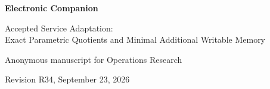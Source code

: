 \documentclass[11pt,letterpaper]{article}
\theoremstyle{definition}\newtheorem{assumption}[theorem]{Assumption}
\begin{document}
\begin{center}{\Large\bfseries Electronic Companion}\par\medskip
{\large Accepted Service Adaptation:\\ Exact Parametric Quotients and Minimal Additional Writable Memory}\par\medskip
Anonymous manuscript for Operations Research\par
Revision R34, September 23, 2026
\end{center}









\end{document}
